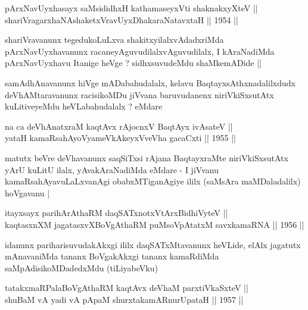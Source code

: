 
\begin{shl}
pArxNavUyxhasayx saMsididhxH kathamaseyxVti shaknakxyXteV || \\
shariVragarxhaNAshaketxVravUyxDhakaraNatavxtaH ||  1954 ||  
\end{shl}

\begin{artha}
shariVravanunx tegedukoLuLxva shakitxyilalxvAdadxriMda
pArxNavUyxhavanunx racaneyAguvudilalxvAguvudilalx, I kAraNadiMda
pArxNavUyxhavu Itanige heVge ? sidhxsuvudeMdu shaMkemADide ||
\end{artha}

\begin{artha}
samAdhAnavanunx hiVge mADabahudalalx, kelavu BaqtayxsAthxnadalilxdudx
deVhAMtaravanunx racisikoMDu jiVvana baruvudanenx niriVkiSxsutAtx
kuLitiveyeMdu heVLabahudalalx ? eMdare
\end{artha}


\begin{shl}
na ca deVhAnatxraM kaqtAvx rAjocnxV BaqtAyx ivA\s \s sateV || \\
yataH kamaRsahAyoV\s yameVkAkeyxVveVha gacaCxti ||  1955 ||  
\end{shl}

\begin{artha}
matutx beVre deVhavanunx saqSiTxsi rAjana BaqtayxraMte niriVkiSxsutAtx
yArU kuLitU ilalx, yAvakAraNadiMda eMdare - I jiVvanu
kamaRsahAyavuLaLxvanAgi obabxMTiganAgiye ililx (saMsAra maMDaladalilx)
hoVgavanu |
\end{artha}


\begin{shl}
itayxsayx parihArAthaRM daqSATxnotxV\s tArxBidhiVyteV ||  \\
kaqtasxnXM jagatasxvXBoVgAthaRM puMsoVpAtatxM savxkamaRNA ||  1956 ||  
\end{shl}

\begin{artha}
idanunx pariharisuvudakAkxgi ililx daqSATxMtavanunx heVLide, elAlx
jagatutx mAnavaniMda tananx BoVgakAkxgi tananx kamaRdiMda
saMpAdisikoMDadedxMdu (tiLiyabeVku)
\end{artha}

\begin{shl}
tatakxmaRPalaBoVgAthaRM kaqtAvx deVhaM parxtiVkaSxteV ||  \\
shuBaM vA yadi vA pApaM shurxtakamARnurUpataH ||  1957 ||  
\end{shl}

